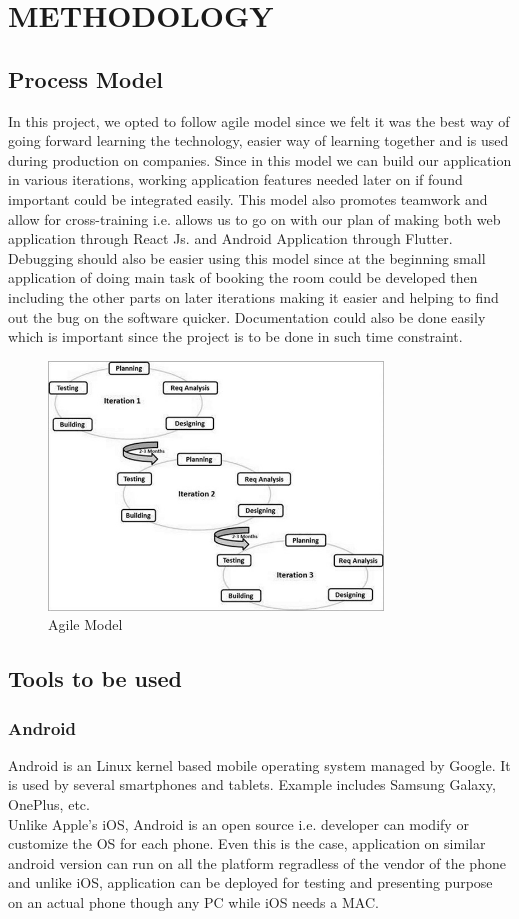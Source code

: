 \chapter{METHODOLOGY}
\section{Process Model}
In this project, we opted to follow agile model\cite{agile} since we felt it was the best way of going forward learning the technology, easier way of learning together and is used during production on companies. Since in this model we can build  our application in various iterations, working application features needed later on if found important could be integrated easily. This model also promotes teamwork and allow for cross-training i.e. allows us to go on with our plan of making both web application through React Js. and Android Application through Flutter. Debugging should also be easier using this model since at the beginning small application of doing main task of booking the room could be developed then including the other parts on later iterations making it easier and helping to find out the bug on the software quicker. Documentation could also be done easily which is important since the project is to be done in such time constraint. 
\begin{figure}[ht]
	\centering
	\includegraphics[width=\linewidth,height=250px]{Graphics/sdlc_agile_model.jpg}
	\caption{Agile Model\cite{agile} }
\end{figure}

\section{Tools to be used}

\subsection{Android}
Android is an Linux kernel based mobile operating system managed by Google. It is used by several smartphones and tablets. Example includes Samsung Galaxy, OnePlus, etc. \\
Unlike Apple's iOS, Android is an open source i.e. developer can modify or customize the OS for each phone. Even this is the case, application on similar android version can run on all the platform regradless of the vendor of the phone and unlike iOS, application can be deployed for testing and presenting purpose on an actual phone though any PC while iOS needs a MAC.

